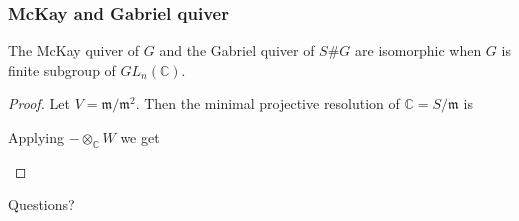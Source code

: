 \documentclass[screen, aspectratio=43]{beamer}
\theoremstyle{definition}
\newcommand{\C}{\mathbb{C}}
\begin{document}
\begin{frame}[fragile]
	\frametitle{McKay and Gabriel quiver}
	\begin{theorem}
		The McKay quiver of $G$ and the Gabriel quiver of $S\#G$ are isomorphic when $G$ is finite subgroup of $GL_n(\C)$.
		\begin{proof}
		Let $V = \mathfrak{m}/\mathfrak{m}^2$. Then the minimal projective resolution of $\C = S / \mathfrak{m}$ is
		\begin{center}
		\end{center}
		Applying $- \otimes_\C W$ we get
		\begin{center}
		\end{center}
		\end{proof}
	\end{theorem}
\end{frame}

\begin{frame}
	\begin{center}  
	\vspace{2cm}
    \begingroup
      \fontsize{40pt}{12pt}\selectfont
      Questions? 
    \endgroup
  	\end{center}	
\end{frame}

\end{document}
